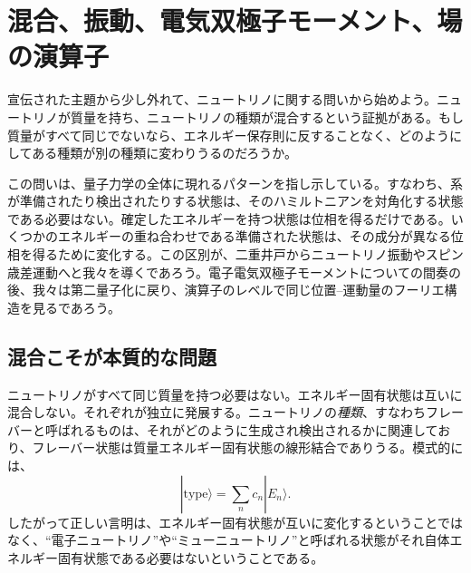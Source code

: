 \chapter{混合、振動、電気双極子モーメント、場の演算子}

宣伝された主題から少し外れて、ニュートリノに関する問いから始めよう。ニュートリノが質量を持ち、ニュートリノの種類が混合するという証拠がある。もし質量がすべて同じでないなら、エネルギー保存則に反することなく、どのようにしてある種類が別の種類に変わりうるのだろうか。

この問いは、量子力学の全体に現れるパターンを指し示している。すなわち、系が準備されたり検出されたりする状態は、そのハミルトニアンを対角化する状態である必要はない。確定したエネルギーを持つ状態は位相を得るだけである。いくつかのエネルギーの重ね合わせである準備された状態は、その成分が異なる位相を得るために変化する。この区別が、二重井戸からニュートリノ振動やスピン歳差運動へと我々を導くであろう。電子電気双極子モーメントについての間奏の後、我々は第二量子化に戻り、演算子のレベルで同じ位置--運動量のフーリエ構造を見るであろう。

\section{混合こそが本質的な問題}

ニュートリノがすべて同じ質量を持つ必要はない。エネルギー固有状態は互いに混合しない。それぞれが独立に発展する。ニュートリノの\emph{種類}、すなわちフレーバーと呼ばれるものは、それがどのように生成され検出されるかに関連しており、フレーバー状態は質量エネルギー固有状態の線形結合でありうる。模式的には、
\begin{equation}
|\text{type}\rangle = \sum_n c_n |E_n\rangle .
\end{equation}
したがって正しい言明は、エネルギー固有状態が互いに変化するということではなく、``電子ニュートリノ''や``ミューニュートリノ''と呼ばれる状態がそれ自体エネルギー固有状態である必要はないということである。

\begin{classroomqa}
\end{classroomqa}


